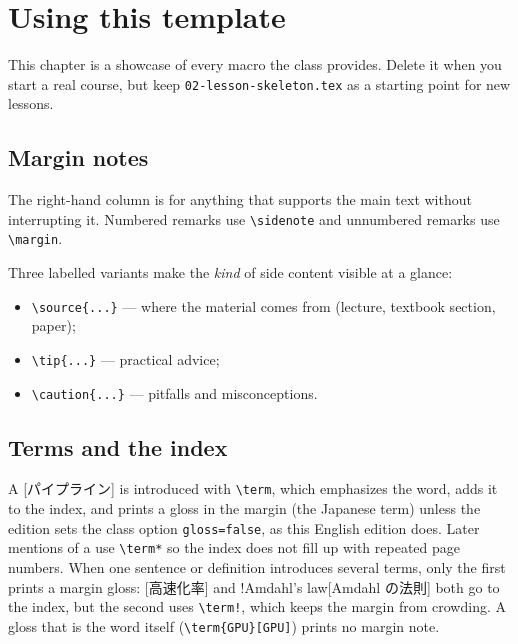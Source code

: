 \documentclass[../main.tex]{subfiles}
\begin{document}
\chapter{Using this template}

This chapter is a showcase of every macro the class provides.  Delete it
when you start a real course, but keep \texttt{02-lesson-skeleton.tex} as a
starting point for new lessons.

\section{Margin notes}

The right-hand column is for anything that supports the main text without
interrupting it.  Numbered remarks use \verb|\sidenote| and unnumbered remarks use
\verb|\margin|.

Three labelled variants make the \emph{kind} of side content visible at a
glance:
\begin{itemize}
  \item \verb|\source{...}| --- where the material comes from (lecture, textbook section, paper);
  \item \verb|\tip{...}| --- practical advice;
  \item \verb|\caution{...}| --- pitfalls and misconceptions.
\end{itemize}

\section{Terms and the index}

A [パイプライン] is introduced with \verb|\term|, which
emphasizes the word, adds it to the index, and prints a gloss in the margin
(the Japanese term) unless the edition sets the class option
\texttt{gloss=false}, as this English edition does.  Later mentions of a
 use \verb|\term*| so the index does not fill up with
repeated page numbers.  When one sentence or definition introduces several
terms, only the first prints a margin gloss: [高速化率] and
\term!{Amdahl's law}[Amdahl の法則] both go to the index, but the second
uses \verb|\term!|, which keeps the margin from crowding.  A gloss that is
the word itself (\verb|\term{GPU}[GPU]|) prints no margin note.
\end{document}
